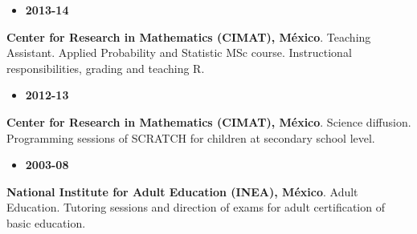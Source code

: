 \documentclass[10 pt]{article}
\begin{document}
\vspace{-0.5cm}
\begin{minipage}[t][.7cm]{0.12\textwidth}
\setlength{\leftmargini}{0.1em}
%
\begin{itemize}
%
%
\item \textbf{2013-14}
%
%
\end{itemize}
\end{minipage}\begin{minipage}[t][.7cm]{0.85\textwidth}
%
%
\textbf{Center for Research in Mathematics (CIMAT), México}. Teaching Assistant. 
Applied Probability and Statistic MSc course.
Instructional responsibilities, grading and teaching R.
%
%
\end{minipage}
%
%
%
%

\vspace{0.15cm}
\begin{minipage}[t][.7cm]{0.12\textwidth}
\setlength{\leftmargini}{0.1em}
\begin{itemize}
%
%
\item \textbf{2012-13}
%
\end{itemize}
%
\end{minipage}\begin{minipage}[t][.7cm]{0.85\textwidth}
%
%
\textbf{Center for Research in Mathematics (CIMAT), México}. Science diffusion.
Programming sessions of SCRATCH for children at secondary school level.
%
%
\end{minipage}

\vspace{0.15cm}
\begin{minipage}[t][.7cm]{0.12\textwidth}
\setlength{\leftmargini}{0.1em}
\begin{itemize}
%
\item \textbf{2003-08}
%
\end{itemize}
\end{minipage}\begin{minipage}[t][.7cm]{0.85\textwidth}
%
%
\textbf{National Institute for Adult Education (INEA), México}. Adult Education.
Tutoring sessions and direction of exams for adult certification of basic education.
%
%
\end{minipage}\\
\end{document}
